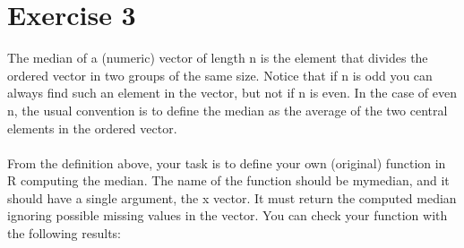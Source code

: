\documentclass{article}\usepackage[]{graphicx}\usepackage[]{xcolor}
\begin{document}
\section{Exercise 3}
The median of a (numeric) vector of length n is the element that divides the ordered vector in two groups of the same size. Notice that if n is odd you can always find such an element in the vector, but not if n is even. In the case of even n, the usual convention is to define the median as the average of the two central elements in the ordered vector. \\ \\
From the definition above, your task is to define your own (original) function in R computing the median. The name of the function should be mymedian, and it should have a single argument, the x vector. It must return the computed median ignoring possible missing values in the vector. You can check your function with the following results:
\end{document}
